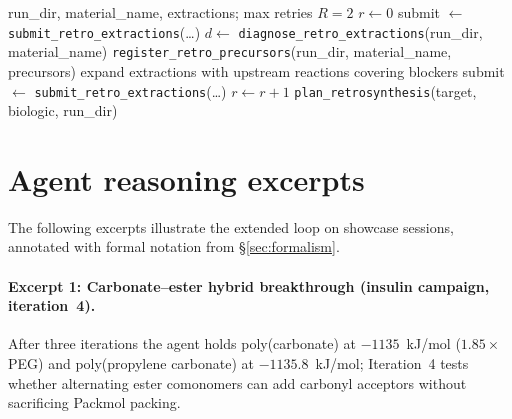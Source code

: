 \documentclass[twocolumn]{fairmeta}
\begin{document}
\begin{algorithm}[H]
\caption{Diagnose/Register Retry Loop}\label{alg:retro_retry}
\small
\begin{algorithmic}[1]
\Require run\_dir, material\_name, extractions; max retries $R=2$
\State $r \gets 0$
\State submit $\gets$ \texttt{submit\_retro\_extractions}(\ldots)
  \State $d \gets$ \texttt{diagnose\_retro\_extractions}(run\_dir, material\_name)
    \State \texttt{register\_retro\_precursors}(run\_dir, material\_name, precursors)
  \Else
    \State expand extractions with upstream reactions covering blockers
    \State submit $\gets$ \texttt{submit\_retro\_extractions}(\ldots)
  \EndIf
  \State $r \gets r + 1$
\EndWhile
\State \Return \texttt{plan\_retrosynthesis}(target, biologic, run\_dir)
\end{algorithmic}
\end{algorithm}

\section{Agent reasoning excerpts}
\label{app:reasoning}

The following excerpts illustrate the extended loop on showcase sessions, annotated with formal notation from \S\ref{sec:formalism}.

\paragraph{Excerpt 1: Carbonate--ester hybrid breakthrough (insulin campaign, iteration~4).}
After three iterations the agent holds poly(carbonate) at $-1135$~kJ/mol ($1.85\times$ PEG) and poly(propylene carbonate) at $-1135.8$~kJ/mol; Iteration~4 tests whether alternating ester comonomers can add carbonyl acceptors without sacrificing Packmol packing.
\end{document}
